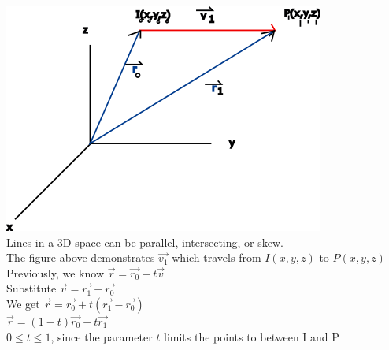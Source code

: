 \documentclass[12pt]{article}
\begin{document}
\includegraphics{3dline2}\\%
Lines in a 3D space can be parallel, intersecting, or skew.\\%
The figure above demonstrates $\vec{v_1}  $ which travels from $I(x,y,z)$ to $P(x,y,z)$\\%
Previously, we know $\vec{r} =\vec{r_0} +t \vec{v}    $\\%
Substitute $\vec{v} =\vec{r_1} -\vec{r_0}  $\\%
We get $\vec{r} =\vec{r_0} +t(\vec{r_1} -  \vec{r_0} )  $ \\%
$\vec{r} =  (1-t)\vec{r_0}  +t\vec{r_1}    $\\%
$0\leq t\leq1$, since the parameter $t$ limits the points to between I and P
\end{document}
